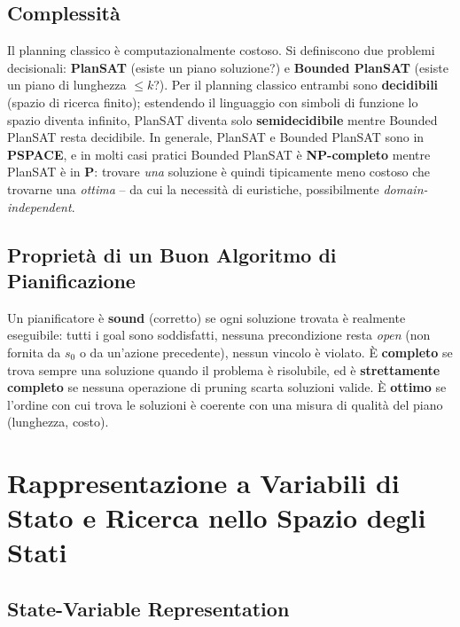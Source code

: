 \documentclass[a4paper,11pt]{article}
\begin{document}
\subsection{Complessità}

Il planning classico è computazionalmente costoso. Si definiscono due problemi decisionali: \textbf{PlanSAT} (esiste un piano soluzione?) e \textbf{Bounded PlanSAT} (esiste un piano di lunghezza $\leq k$?). Per il planning classico entrambi sono \textbf{decidibili} (spazio di ricerca finito); estendendo il linguaggio con simboli di funzione lo spazio diventa infinito, PlanSAT diventa solo \textbf{semidecidibile} mentre Bounded PlanSAT resta decidibile. In generale, PlanSAT e Bounded PlanSAT sono in \textbf{PSPACE}, e in molti casi pratici Bounded PlanSAT è \textbf{NP-completo} mentre PlanSAT è in \textbf{P}: trovare \emph{una} soluzione è quindi tipicamente meno costoso che trovarne una \emph{ottima} -- da cui la necessità di euristiche, possibilmente \emph{domain-independent}.

\subsection{Proprietà di un Buon Algoritmo di Pianificazione}

Un pianificatore è \textbf{sound} (corretto) se ogni soluzione trovata è realmente eseguibile: tutti i goal sono soddisfatti, nessuna precondizione resta \emph{open} (non fornita da $s_0$ o da un'azione precedente), nessun vincolo è violato. È \textbf{completo} se trova sempre una soluzione quando il problema è risolubile, ed è \textbf{strettamente completo} se nessuna operazione di pruning scarta soluzioni valide. È \textbf{ottimo} se l'ordine con cui trova le soluzioni è coerente con una misura di qualità del piano (lunghezza, costo).

\newpage
\section{Rappresentazione a Variabili di Stato e Ricerca nello Spazio degli Stati}

\subsection{State-Variable Representation}
\end{document}
